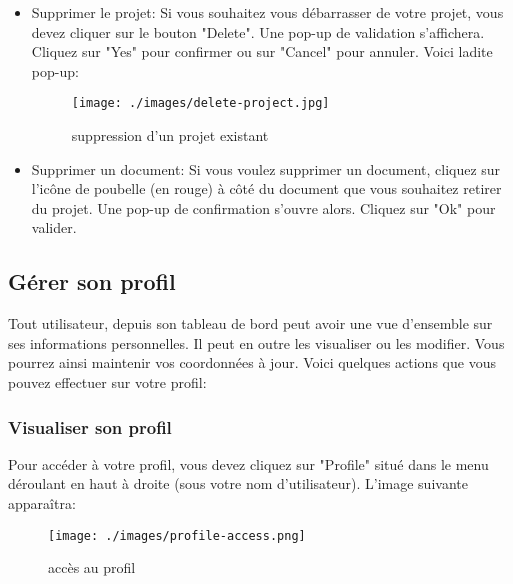 \documentclass[12pt]{article}
\begin{document}
\begin{itemize}
        \medskip

    \item Supprimer le projet: Si vous souhaitez vous débarrasser de votre projet, vous devez cliquer sur le bouton "Delete". Une pop-up de validation s'affichera. Cliquez sur "Yes" pour confirmer ou sur "Cancel" pour annuler. Voici ladite pop-up:
        \begin{figure}[h!]
            \centering
            \texttt{[image: ./images/delete-project.jpg]}
            \caption{suppression d'un projet existant}
            \label{fig:suppression d'un projet existant}
        \end{figure}

       \medskip
    \item Supprimer un document: Si vous voulez supprimer un document, cliquez sur l'icône de poubelle (en rouge) à côté du document que vous souhaitez retirer du projet. Une pop-up de confirmation s'ouvre alors. Cliquez sur "Ok" pour valider.     
\end{itemize}

\medskip
\subsection{Gérer son profil}
Tout utilisateur, depuis son tableau de bord peut avoir une vue d'ensemble sur ses informations personnelles. Il peut en outre les visualiser ou les modifier. Vous pourrez ainsi maintenir vos coordonnées à jour.
Voici quelques actions que vous pouvez effectuer sur votre profil:

\medskip
\subsubsection{Visualiser son profil}
Pour accéder à votre profil, vous devez cliquez sur "Profile" situé dans le menu déroulant en haut à droite (sous votre nom d'utilisateur). L'image suivante apparaîtra: 
\medskip

\begin{figure}[h!]
\centering
\texttt{[image: ./images/profile-access.png]}
\caption{accès au profil}
\label{fig:accès au profil}
\end{figure}

\medskip
\end{document}
